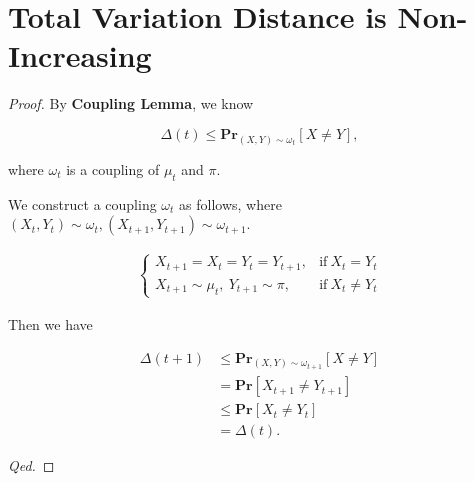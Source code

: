 \documentclass{article}
\begin{document}
\newpage

\section{Total Variation Distance is Non-Increasing}
\vspace{1em}

\begin{proof}
    By \textbf{Coupling Lemma}, we know
    
    \vspace{-1em}
    $$\Delta(t)\le\mathbf{Pr}_{(X,Y)\sim\omega_t}\left[X\neq Y\right],$$
    
    \vspace{-0.3em}\hspace{5.3em}
    where $\omega_t$ is a coupling of $\mu_t$ and $\pi$.
    
    \vspace{0.7em} \hspace{1.3em}
    We construct a coupling $\omega_{t}$ as follows, where $(X_t,Y_t)\sim\omega_t,(X_{t+1},Y_{t+1})\sim\omega_{t+1}$.
    
    \vspace{-2.2em}
    \begin{align*}
        \left\{\begin{array}{ll}
            X_{t+1}=X_t=Y_t=Y_{t+1}, & \mathrm{if\ }X_t=Y_t \\
            X_{t+1}\sim\mu_t,\ Y_{t+1}\sim\pi, & \mathrm{if\ }X_t\neq Y_t
        \end{array}\right.
    \end{align*}
    
    \hspace{1.3em}
    Then we have
    
    \vspace{-3em}
    \begin{align*}
        \Delta(t+1) &\le \mathbf{Pr}_{(X,Y)\sim\omega_{t+1}}\left[X\neq Y\right] \\
        &= \mathbf{Pr}\left[X_{t+1}\neq Y_{t+1}\right] \\
        &\le \mathbf{Pr}\left[X_{t}\neq Y_{t}\right] \\
        &= \Delta(t).
    \end{align*}
    
    \hspace{38em}
    \textit{Qed.}
\end{proof}
\end{document}
